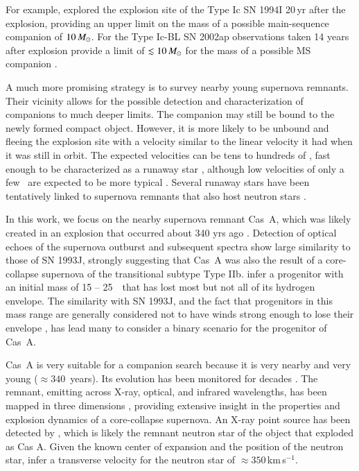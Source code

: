 \documentclass{aa}
\begin{document}
For example,  \citet{2016ApJ...818...75V} explored the explosion site of the Type Ic SN 1994I 20\,yr after the explosion, providing an upper limit on the mass of a possible main-sequence companion of $10\,\hbox{$M_{\odot}$}$. For the Type Ic-BL SN 2002ap observations taken 14 years after explosion provide a limit of $\lesssim 10\,\hbox{$M_{\odot}$}$ for the mass of a possible MS companion \citep{2007MNRAS.381..835C,2017ApJ...842..125Z}.

A much more promising strategy is to survey nearby young supernova remnants.  Their vicinity allows for the possible detection and characterization of companions to much deeper limits.  The companion may still be bound to the newly formed compact object. However, it is more likely to be unbound and fleeing the explosion site with a velocity similar to the linear velocity it had when it was still in orbit.  The expected velocities can be tens to hundreds of \kms, fast enough to be characterized as a runaway star \citep{1961BAN....15..265B,2001A&A...365...49H,2011MNRAS.414.3501E}, although low velocities of only a few \kms\ are expected to be more typical \citep[][]{2014ApJ...782....7D, 2018arXiv180409164R}.  Several runaway stars have been tentatively linked to supernova remnants that also host neutron stars \citep{2011ApJ...743L..22D,2013MNRAS.435..879T,2014AN....335..981T,2015MNRAS.448.3196D,2017A&A...606A..14B}.

In this work, we focus on the nearby supernova remnant Cas~A, which was likely created in an explosion that occurred about 340 yrs ago \citep{2006ApJ...636..848F}.  Detection of optical echoes of the supernova outburst and subsequent spectra \citep{2008Natur.456..617K, 2008ApJ...681L..81R} show large similarity to those of SN 1993J, strongly suggesting that Cas~A was also the result of a core-collapse supernova of the transitional subtype Type IIb. \citet{2006ApJ...640..891Y} infer a progenitor with an initial mass of 15 -- 25~\msun\ that has lost most but not all of its hydrogen envelope. The similarity with SN 1993J, and the fact that progenitors in this mass range are generally considered not to have winds strong enough to lose their envelope \citep{2003ApJ...591..288H, 2018MNRAS.475...55B}, has lead many to consider a binary scenario for the progenitor of Cas~A.

Cas~A is very suitable for a companion search because it is very nearby \citep[3.4 kpc; see ][]{1995ApJ...440..706R, 2014MNRAS.441.2996A} and very young ($\approx340$~years).  Its evolution has been monitored for decades \citep{1954ApJ...119..206B,2014ApJ...789..138P}. The remnant, emitting across X-ray, optical, and infrared wavelengths, has been mapped in three dimensions \citep{1995ApJ...440..706R,2010ApJ...725.2038D,2015Sci...347..526M}, providing extensive insight in the properties and explosion dynamics of a core-collapse supernova.
%
An X-ray point source has been detected by \citet{1999IAUC.7246....1T}, which is likely the remnant neutron star of the object that exploded as Cas A.  Given the known center of expansion and the position of the neutron star, \citet{2006ApJ...645..283F} infer a transverse velocity for the neutron star of $\approx 350$\,km\,s$^{-1}$.
\end{document}
